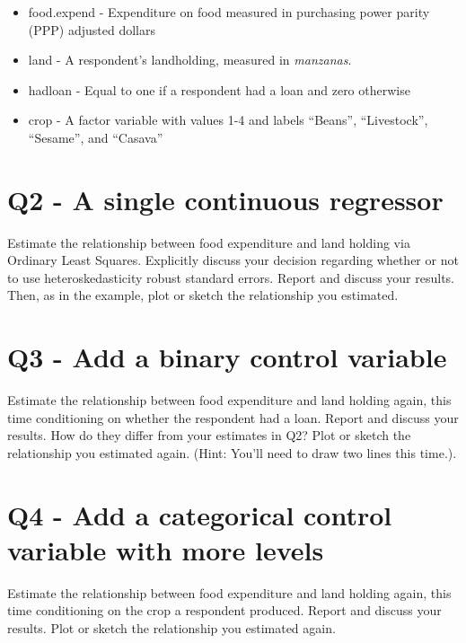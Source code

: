 \documentclass[12pt]{article}		%
\begin{document}
\begin{itemize}
	\item food.expend - Expenditure on food measured in purchasing power parity (PPP) adjusted dollars
	\item land - A respondent's landholding, measured in \textit{manzanas}.
	\item hadloan - Equal to one if a respondent had a loan and zero otherwise
	\item crop - A factor variable with values 1-4 and labels ``Beans'', ``Livestock'', ``Sesame'', and ``Casava''
\end{itemize}


\clearpage

\section*{Q2 - A single continuous regressor}

Estimate the relationship between food expenditure and land holding via Ordinary Least Squares. Explicitly discuss your decision regarding whether or not to use heteroskedasticity robust standard errors. Report and discuss your results. Then, as in the example, plot or sketch the relationship you estimated.

\clearpage

\section*{Q3 - Add a binary control variable}

Estimate the relationship between food expenditure and land holding again, this time conditioning on whether the respondent had a loan. Report and discuss your results. How do they differ from your estimates in Q2? Plot or sketch the relationship you estimated again. (Hint: You'll need to draw two lines this time.).

\clearpage

\section{Q4 - Add a categorical control variable with more levels}

Estimate the relationship between food expenditure and land holding again, this time conditioning on the crop a respondent produced. Report and discuss your results. Plot or sketch the relationship you estimated again.	

\clearpage
\end{document}
